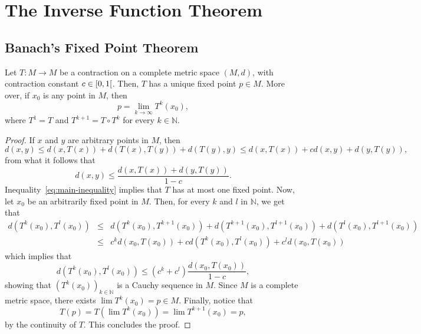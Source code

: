 \chapter{The Inverse Function Theorem}\label{chp:the_inverse_function_theorem}

\section{Banach's Fixed Point Theorem}\label{sec:banach_s_fixed_point_theorem}

\begin{theorem}\label{thm:banach's fixed point theorem}
	Let \(T:{M}\to{M}\) be a contraction on a complete metric space \((M,d)\), with contraction constant \({c}\in{\rinterval{0}{1}}\). Then, \(T\) has a unique fixed point \({p}\in{M}\). More over, if \(x_{0}\) is any point in \(M\), then \[p=\lim_{k\to\infty}T^{k}(x_{0}),\] where \(T^{1}=T\) and \(T^{k+1}=T\circ{T^{k}}\) for every \({k}\in{\mathbb{N}}\).
\end{theorem}

\begin{proof}
	If \(x\) and \(y\) are arbitrary points in \(M\), then
	\[
		d(x,y)
		\leqslant
		d(x,T(x)) + d(T(x),T(y)) + d(T(y),y)
		\leqslant
		d(x,T(x)) + cd(x,y) + d(y,T(y)),
	\]
	from what it follows that
	\begin{equation}\label{eq:main-inequality}
		d(x,y)
		\leqslant
		\frac{d(x,T(x)) + d(y,T(y))}{1 - c}.
	\end{equation}
	Inequality~\eqref{eq:main-inequality} implies that \(T\) has at most one fixed point. Now, let \(x_{0}\) be an arbitrarily fixed point in \(M\). Then, for every \(k\) and \(l\) in \(\mathbb{N}\), we get that
	\[
		\begin{array}{rcl}
			d(T^{k}(x_{0}),T^{l}(x_{0}))
			 & \leqslant &
			d(T^{k}(x_{0}),T^{k+1}(x_{0}))
			+
			d(T^{k+1}(x_{0}),T^{l+1}(x_{0}))
			+
			d(T^{l}(x_{0}),T^{l+1}(x_{0}))
			\\
			 & \leqslant &
			c^{k}d(x_{0},T(x_{0}))
			+
			cd(T^{k}(x_{0}),T^{l}(x_{0}))
			+
			c^{l}d(x_{0},T(x_{0}))
		\end{array}
	\]
	which implies that
	\begin{equation}\label{eq:the-sequence-of-iterates-is-cauchy}
		d(T^{k}(x_{0}),T^{l}(x_{0}))
		\leqslant
		(c^{k}+c^{l})\frac{d(x_{0},T(x_{0}))}{1-c},
	\end{equation}
	showing that \(\left(T^{k}(x_{0})\right)_{{k}\in{\mathbb{N}}}\) is a Cauchy sequence in \(M\). Since \(M\) is a complete metric space, there exists \(\lim{T^{k}(x_{0})}=p\in{M}\). Finally, notice that
	\[
		T(p)=T(\lim{T^{k}(x_{0})})=\lim{T^{k+1}(x_{0})}=p,
	\]
	by the continuity of \(T\). This concludes the proof.
\end{proof}

